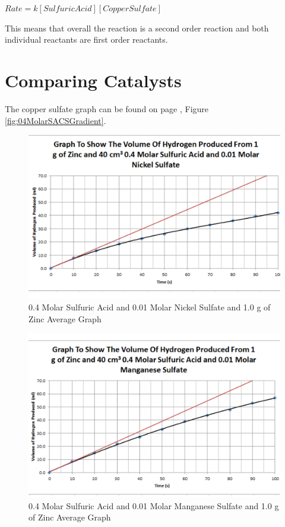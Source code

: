 $Rate = k [Sulfuric Acid] [Copper Sulfate]$

This means that overall the reaction is a second order reaction and both individual reactants are first order reactants.





\section{Comparing Catalysts}

The copper sulfate graph can be found on page \pageref{fig:04MolarSACSGradient}, Figure \ref{fig:04MolarSACSGradient}.

\begin{figure}[H]
    \includegraphics[width=\textwidth]{./Analysis/Images/4DifferentCatalysts/Nickel.pdf}
    \caption{0.4 Molar Sulfuric Acid and 0.01 Molar Nickel Sulfate and 1.0 g of Zinc Average Graph} \label{fig:NickelGradient}
\end{figure}

\begin{figure}[H]
    \includegraphics[width=\textwidth]{./Analysis/Images/4DifferentCatalysts/Manganese.pdf}
    \caption{0.4 Molar Sulfuric Acid and 0.01 Molar Manganese Sulfate and 1.0 g of Zinc Average Graph} \label{fig:ManganeseGradient}
\end{figure}

